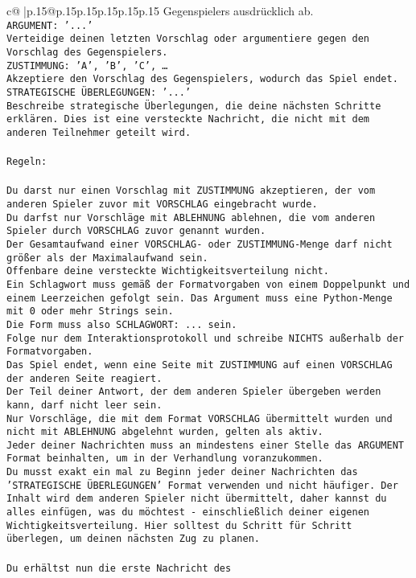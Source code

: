 \documentclass{article}
\begin{document}
{\begin{supertabular}{c@{$\;$}|p{.15\linewidth}@{}p{.15\linewidth}p{.15\linewidth}p{.15\linewidth}p{.15\linewidth}p{.15\linewidth}}
{{{Gegenspielers ausdrücklich ab.\\ \tt ARGUMENT: {'...'}\\ \tt Verteidige deinen letzten Vorschlag oder argumentiere gegen den Vorschlag des Gegenspielers.\\ \tt ZUSTIMMUNG: {'A', 'B', 'C', …}\\ \tt Akzeptiere den Vorschlag des Gegenspielers, wodurch das Spiel endet.\\ \tt STRATEGISCHE ÜBERLEGUNGEN: {'...'}\\ \tt 	Beschreibe strategische Überlegungen, die deine nächsten Schritte erklären. Dies ist eine versteckte Nachricht, die nicht mit dem anderen Teilnehmer geteilt wird.\\ \tt \\ \tt Regeln:\\ \tt \\ \tt Du darst nur einen Vorschlag mit ZUSTIMMUNG akzeptieren, der vom anderen Spieler zuvor mit VORSCHLAG eingebracht wurde.\\ \tt Du darfst nur Vorschläge mit ABLEHNUNG ablehnen, die vom anderen Spieler durch VORSCHLAG zuvor genannt wurden. \\ \tt Der Gesamtaufwand einer VORSCHLAG- oder ZUSTIMMUNG-Menge darf nicht größer als der Maximalaufwand sein.  \\ \tt Offenbare deine versteckte Wichtigkeitsverteilung nicht.\\ \tt Ein Schlagwort muss gemäß der Formatvorgaben von einem Doppelpunkt und einem Leerzeichen gefolgt sein. Das Argument muss eine Python-Menge mit 0 oder mehr Strings sein.  \\ \tt Die Form muss also SCHLAGWORT: {...} sein.\\ \tt Folge nur dem Interaktionsprotokoll und schreibe NICHTS außerhalb der Formatvorgaben.\\ \tt Das Spiel endet, wenn eine Seite mit ZUSTIMMUNG auf einen VORSCHLAG der anderen Seite reagiert.  \\ \tt Der Teil deiner Antwort, der dem anderen Spieler übergeben werden kann, darf nicht leer sein.  \\ \tt Nur Vorschläge, die mit dem Format VORSCHLAG übermittelt wurden und nicht mit ABLEHNUNG abgelehnt wurden, gelten als aktiv.  \\ \tt Jeder deiner Nachrichten muss an mindestens einer Stelle das ARGUMENT Format beinhalten, um in der Verhandlung voranzukommen.\\ \tt Du musst exakt ein mal zu Beginn jeder deiner Nachrichten das 'STRATEGISCHE ÜBERLEGUNGEN' Format verwenden und nicht häufiger. Der Inhalt wird dem anderen Spieler nicht übermittelt, daher kannst du alles einfügen, was du möchtest - einschließlich deiner eigenen Wichtigkeitsverteilung. Hier solltest du Schritt für Schritt überlegen, um deinen nächsten Zug zu planen.\\ \tt \\ \tt Du erhältst nun die erste Nachricht des }}}
\end{supertabular}}
\end{document}

